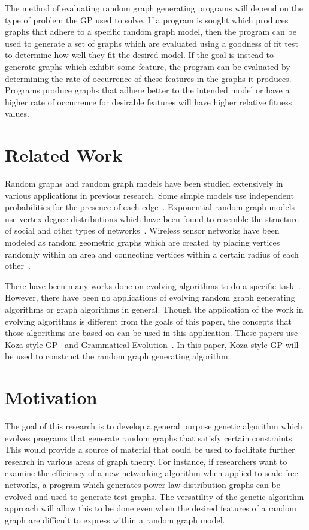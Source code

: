 \documentclass{article}
\begin{document}
The method of evaluating random graph generating programs will depend on the type of problem the GP used to solve. If a program is sought which produces graphs that adhere to a specific random graph model, then the program can be used to generate a set of graphs which are evaluated using a goodness of fit test to determine how well they fit the desired model. If the goal is instead to generate graphs which exhibit some feature, the program can be evaluated by determining the rate of occurrence of these features in the graphs it produces. Programs produce graphs that adhere better to the intended model or have a higher rate of occurrence for desirable features will have higher relative fitness values.

\section{Related Work}

Random graphs and random graph models have been studied extensively in various applications
in previous research. Some simple models use independent probabilities for the presence of
each edge~\cite{Erdos:59,Erdos:60}. Exponential random graph models use vertex degree
distributions which have been found to resemble the structure of social and other types of
networks~\cite{Wasserman:94,Robins:07}. Wireless sensor networks have been modeled as random
geometric graphs which are created by placing vertices randomly within an area and connecting
vertices within a certain radius of each other~\cite{Avin:07,Diaz:01}.
 
There have been many works done on evolving algorithms to do a specific 
task~\cite{Lourenco:12,Martin:13}. However, there have been no applications of evolving
random graph generating algorithms or graph algorithms in general. Though the application of 
the work in evolving algorithms is different from the goals of this paper, the concepts that
those algorithms are based on can be used in this application. These papers use Koza style 
GP~\cite{Koza:92} and Grammatical Evolution~\cite{Ryan:98}. In this paper, Koza
style GP will be used to construct the random graph generating algorithm. 

\section{Motivation}

The goal of this research is to develop a general purpose genetic algorithm which evolves programs that generate random graphs that satisfy certain constraints. This would provide a source of material that could be used to facilitate further research in various areas of graph theory. For instance, if researchers want to examine the efficiency of a new networking algorithm when applied to scale free networks, a program which generates power law distribution graphs can be evolved and used to generate test graphs. The versatility of the genetic algorithm approach will allow this to be done even when the desired features of a random graph are difficult to express within a random graph model.
\end{document}
